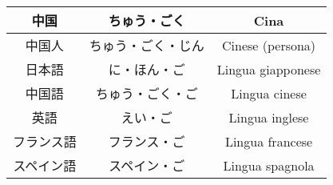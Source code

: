 \documentclass{article}
\let\ita\textitalian
\begin{document}
\begin{center}
\begin{japanese}
\begin{longtable}{|c|c|c|}
                \hline
                中国 & ちゅう・ごく & \ita{Cina}\\
                \hline
                中国人 & ちゅう・ごく・じん & \ita{Cinese (persona)}\\
                \hline
                日本語 & に・ほん・ご & \ita{Lingua giapponese}\\
                \hline
                中国語 & ちゅう・ごく・ご & \ita{Lingua cinese}\\
                \hline
                英語 & えい・ご & \ita{Lingua inglese}\\
                \hline
                フランス語 & フランス・ご & \ita{Lingua francese}\\
                \hline
                スペイン語 & スペイン・ご & \ita{Lingua spagnola}\\
                \hline
            \end{longtable}
        \end{japanese}
    \end{center}
\end{document}
